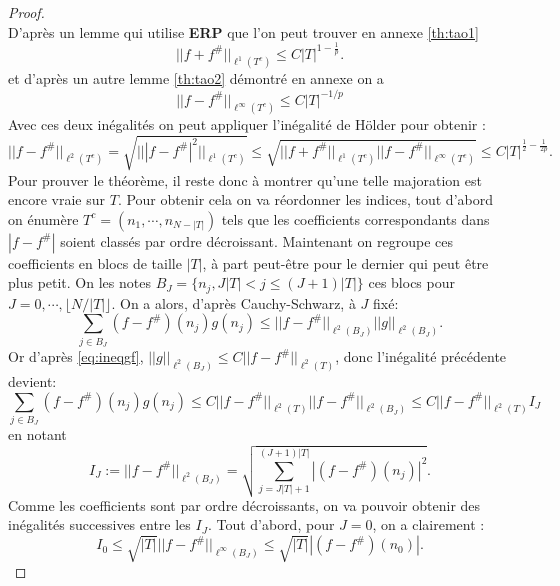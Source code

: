 \begin{proof}
\begin{equation}
	\end{equation}
	D'après un lemme qui utilise \textbf{ERP} que l'on peut trouver en annexe \ref{th:tao1} 
	\begin{equation}\label{eq:ineqtc}
		||f + f^\#||_{\ell^1(T^c)} \leq C |T|^{1-\frac{1}{p}}.
	\end{equation}
	et d'après un autre lemme \ref{th:tao2} démontré en annexe on a 
	\begin{equation}\label{eq:ineqinf}
		||f-f^\#||_{\ell^\infty (T^c)} \leq C |T|^{-1/p}
	\end{equation}
	Avec ces deux inégalités on peut appliquer l'inégalité de Hölder pour obtenir :
	\begin{equation}
		||f-f^\#||_{\ell^2(T^c)} = \sqrt{|||f-f^\#|^2||_{\ell^1(T^c)}} \leq \sqrt{||f + f^\#||_{\ell^1(T^c)} 	||f-f^\#||_{\ell^\infty (T^c)}} \leq C |T|^{\frac{1}{2} - \frac{1}{2p}}.
	\end{equation}
	Pour prouver le théorème, il reste donc à montrer qu'une telle majoration est encore vraie sur $T$.
	Pour obtenir cela on va réordonner les indices, tout d'abord on énumère $T^c=(n_1, \cdots, n_{N-|T|})$ tels que les coefficients correspondants dans $|f-f^\#|$ soient classés par ordre décroissant.
	Maintenant on regroupe ces coefficients en blocs de taille $|T|$, à part peut-être pour le dernier qui peut être plus petit.
	On les notes $B_J =\{n_j, J|T| < j \leq (J+1)|T|\}$ ces blocs pour $J=0,\cdots, \lfloor N/|T| \rfloor$.
	On a alors, d'après Cauchy-Schwarz, à $J$ fixé:
	\begin{equation}
		\sum_{j\in B_J} (f-f^\#)(n_j) g(n_j) \leq ||f-f^\#||_{\ell^2(B_J)} ||g||_{\ell^2(B_J)}.
	\end{equation}
	Or d'après \ref{eq:ineqgf}, $||g||_{\ell^2(B_J)} \leq C||f-f^\#||_{\ell^2(T)}$, donc l'inégalité précédente devient:
	\begin{equation}\label{eq:ineqbj}
		\sum_{j\in B_J} (f-f^\#)(n_j) g(n_j) \leq C ||f-f^\#||_{\ell^2(T)} ||f-f^\#||_{\ell^2(B_J)} \leq C ||f-f^\#||_{\ell^2(T)} I_J
	\end{equation}
	en notant
	\begin{equation}
		I_J := ||f-f^\#||_{\ell^2(B_J)} = \sqrt{\sum_{j=J|T| + 1}^{(J+1)|T|} |(f-f^\#)(n_j)|^2}.
	\end{equation}
	Comme les coefficients sont par ordre décroissants, on va pouvoir obtenir des inégalités successives entre les $I_J$.
	Tout d'abord, pour $J=0$, on  a clairement :
	\begin{equation}
		I_0 \leq \sqrt{|T|}||f-f^\#||_{\ell^\infty(B_J)} \leq \sqrt{|T|} |(f-f^\#)(n_0)|.

\end{equation}
\end{proof}
